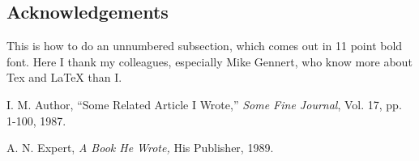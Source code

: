 \subsection*{Acknowledgements}
This is how to do an unnumbered subsection, which comes out in 11 point bold
font.  Here I thank my colleagues, especially Mike Gennert, who know more 
about Tex and LaTeX than I.

\begin{thebibliography}{9}

I. M. Author, 
``Some Related Article I Wrote,''
{\em Some Fine Journal}, Vol. 17, pp. 1-100, 1987.

A. N. Expert, 
{\em A Book He Wrote,}
His Publisher, 1989.

\end{thebibliography}


